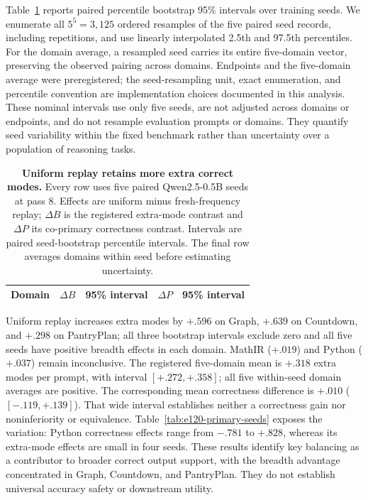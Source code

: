\documentclass{article}
\newcommand{\1}{\mathbf 1}
\theoremstyle{remark}
\theoremstyle{definition}
\theoremstyle{plain}
\begin{document}
Table~\ref{tab:e120-primary-breadth} reports paired percentile bootstrap
95\% intervals over training seeds. We enumerate all $5^5=3{,}125$ ordered
resamples of the five paired seed records, including repetitions, and use
linearly interpolated 2.5th and 97.5th percentiles. For the domain average,
a resampled seed carries its entire five-domain vector, preserving the
observed pairing across domains. Endpoints and the five-domain average were
preregistered; the seed-resampling unit, exact enumeration, and percentile
convention are implementation choices documented in this analysis. These
nominal intervals use only five seeds, are not adjusted across domains or
endpoints, and do not resample evaluation prompts or domains. They quantify
seed variability within the fixed benchmark rather than uncertainty over a
population of reasoning tasks.

\begin{table}[H]
  \centering
  \caption{\textbf{Uniform replay retains more extra correct modes.}
  Every row uses five paired Qwen2.5-0.5B seeds at pass 8. Effects are
  uniform minus fresh-frequency replay; $\Delta B$ is the registered
  extra-mode contrast and $\Delta P$ its co-primary correctness contrast.
  Intervals are paired seed-bootstrap percentile intervals. The final row
  averages domains within seed before estimating uncertainty.}
  \label{tab:e120-primary-breadth}
  \small
  \setlength{\tabcolsep}{4pt}
  \begin{tabular}{@{}lrrrr@{}}
    \toprule
    \textbf{Domain} & $\Delta B$ & \textbf{95\% interval}
      & $\Delta P$ & \textbf{95\% interval} \\
    \midrule
    
  \end{tabular}
\end{table}

Uniform replay increases extra modes by $+.596$ on Graph, $+.639$ on
Countdown, and $+.298$ on PantryPlan; all three bootstrap intervals exclude
zero and all five seeds have positive breadth effects in each domain.
MathIR ($+.019$) and Python ($+.037$) remain inconclusive. The registered
five-domain mean is $+.318$ extra modes per prompt, with interval
$[+.272,+.358]$; all five within-seed domain averages are positive.
The corresponding mean correctness difference is $+.010$
($[-.119,+.139]$). That wide interval establishes neither a correctness gain
nor noninferiority or equivalence. Table~\ref{tab:e120-primary-seeds} exposes
the variation: Python correctness effects range from $-.781$ to $+.828$,
whereas its extra-mode effects are small in four seeds. These results identify key balancing as a contributor to broader correct
output support, with the breadth advantage concentrated in Graph, Countdown,
and PantryPlan. They do not establish universal accuracy safety or downstream
utility.
\end{document}
